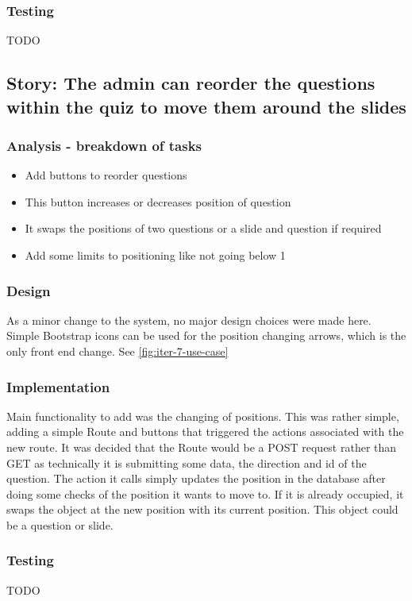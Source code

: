 \subsubsection{Testing}
TODO
\newpage

\subsection{Story: The admin can reorder the questions within the quiz to move them around the slides}
\subsubsection{Analysis - breakdown of tasks}
\begin{itemize}
	\item Add buttons to reorder questions
	\item This button increases or decreases position of question
	\item It swaps the positions of two questions or a slide and question if required
	\item Add some limits to positioning like not going below 1
\end{itemize}
\subsubsection{Design}
As a minor change to the system, no major design choices were made here. Simple Bootstrap icons can be used for the position changing arrows, which is the only front end change.
See \ref{fig:iter-7-use-case} 
\subsubsection{Implementation}
Main functionality to add was the changing of positions. This was rather simple, adding a simple Route and buttons that triggered the actions associated with the new route. It was decided that the Route would be a POST request rather than GET as technically it is submitting some data, the direction and id of the question. The action it calls simply updates the position in the database after doing some checks of the position it wants to move to. If it is already occupied, it swaps the object at the new position with its current position. This object could be a question or slide.   
\subsubsection{Testing}
TODO
\newpage

